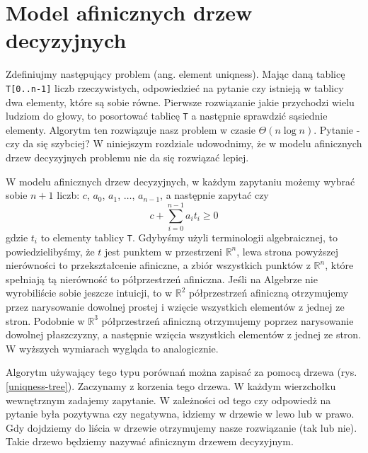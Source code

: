 \section{Model afinicznych drzew decyzyjnych}

Zdefiniujmy następujący problem (ang. element uniqness).
Mając daną tablicę \texttt{T[0..n-1]} liczb rzeczywistych, odpowiedzieć na pytanie czy istnieją w tablicy dwa elementy, które są sobie równe.
Pierwsze rozwiązanie jakie przychodzi wielu ludziom do głowy, to posortować tablicę \texttt{T} a następnie sprawdzić sąsiednie elementy.
Algorytm ten rozwiązuje nasz problem w czasie $\Theta(n \log n)$.
Pytanie - czy da się szybciej?
W niniejszym rozdziale udowodnimy, że w modelu afinicznych drzew decyzyjnych problemu nie da się rozwiązać lepiej.

W modelu afinicznych drzew decyzyjnych, w każdym zapytaniu możemy wybrać sobie $n+1$ liczb: $c$, $a_0$, $a_1$, $\dots$, $a_{n-1}$, a następnie zapytać czy
\[
 c + \sum_{i=0}^{n-1} a_i t_i \geq 0
\]
gdzie $t_i$ to elementy tablicy \texttt{T}.
Gdybyśmy użyli terminologii algebraicznej, to powiedzielibyśmy, że $t$ jest punktem w przestrzeni $\mathbb{R}^n$, lewa strona powyższej nierówności to przekształcenie afiniczne,
a zbiór wszystkich punktów z $\mathbb{R}^n$, które spełniają tą nierówność to półprzestrzeń afiniczna.
Jeśli na Algebrze nie wyrobiliście sobie jeszcze intuicji, to w $\mathbb{R}^2$ półprzestrzeń afiniczną otrzymujemy przez narysowanie dowolnej prostej i wzięcie wszystkich elementów z jednej ze stron.
Podobnie w $\mathbb{R}^3$ półprzestrzeń afiniczną otrzymujemy poprzez narysowanie dowolnej płaszczyzny, a następnie wzięcia wszystkich elementów z jednej ze stron.
W wyższych wymiarach wygląda to analogicznie.

Algorytm używający tego typu porównań można zapisać za pomocą drzewa (rys. \ref{uniqness-tree}).
Zaczynamy z korzenia tego drzewa.
W każdym wierzchołku wewnętrznym zadajemy zapytanie.
W zależności od tego czy odpowiedż na pytanie była pozytywna czy negatywna, idziemy w drzewie w lewo lub w prawo.
Gdy dojdziemy do liścia w drzewie otrzymujemy nasze rozwiązanie (tak lub nie).
Takie drzewo będziemy nazywać afinicznym drzewem decyzyjnym.

